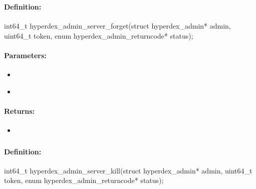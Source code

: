 \pagebreak
\subsubsection{}
\label{api:c:server_forget}


\paragraph{Definition:}
\begin{ccode}
int64_t hyperdex_admin_server_forget(struct hyperdex_admin* admin,
        uint64_t token,
        enum hyperdex_admin_returncode* status);
\end{ccode}

\paragraph{Parameters:}
\begin{itemize}[noitemsep]
\item {}\\

\item {}\\

\end{itemize}

\paragraph{Returns:}
\begin{itemize}[noitemsep]
\item {}\\

\end{itemize}

\pagebreak
\subsubsection{}
\label{api:c:server_kill}


\paragraph{Definition:}
\begin{ccode}
int64_t hyperdex_admin_server_kill(struct hyperdex_admin* admin,
        uint64_t token,
        enum hyperdex_admin_returncode* status);
\end{ccode}

